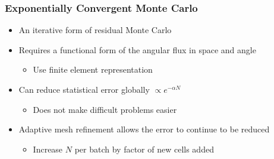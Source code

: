 \documentclass[xcolor=dvipsnames,handout,unknownkeysallowed]{beamer}
\newcommand{\colb}[1]{{\color{blue} #1}}
\newlength{\wideitemsep}
\let\olditem\item
\renewcommand{\item}{\setlength{\itemsep}{\wideitemsep}\olditem}
\begin{document}
\begin{frame}
    \frametitle{Exponentially Convergent Monte Carlo}
    \begin{itemize}
        \item An iterative form of residual Monte Carlo
        \item Requires a functional form of the angular flux in space and angle
            \begin{itemize}
                \item Use finite element representation
            \end{itemize}
    \item Can reduce statistical error \colb{globally} $\propto e^{-\alpha N}$
            \begin{itemize}
                \item Does not make difficult problems easier
            \end{itemize}
        \item Adaptive mesh refinement allows the error to continue to be reduced
            \begin{itemize}
                \item Increase $N$ per batch by factor of new cells added
            \end{itemize}
    \end{itemize}


\end{frame}
\end{document}
